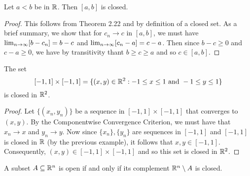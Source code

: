 \documentclass[letterpaper, twoside, 12pt]{book}
\begin{document}
\begin{example}[10.14]
  Let \(a<b\) be in \(\mathbb R\). Then \([a,b]\) is closed.
\end{example}

\begin{proof}
    This follows from Theorem 2.22 and by definition of 
    a closed set. As a brief summary, we show that for 
    \(c_n \to c \) in \([a,b]\), we must have
    \(\lim_{n \to \infty} [b - c_n] = b - c\) and \(\lim_{n \to \infty} [c_n - a] = c - a\).
    Then since \(b - c \geq 0 \) and \(c - a \geq 0\), we
    have by transitivity thant \(b \geq c \geq a \) and so
    \(c \in [a,b]\).
\end{proof}

\begin{example}[10.15]
  The set
  \[
    [-1,1]\times[-1,1]
      =
    \{(x,y)\in\mathbb R^2:-1\leq x\leq 1 \text{~and~} -1\leq y\leq 1\}
  \]
  is closed in \(\mathbb R^2\).
\end{example}

\begin{proof}
    Let \(\{(x_n, y_n)\}\) be a sequence in \([-1,1]\times[-1,1]\) that
    converges to \((x,y)\). By the Componentwise Convergence Criterion,
    we must have that \(x_n \to x\) and \(y_n \to y\). Now since 
    \(\{x_n\}, \{y_n\}\) are sequences in \([-1, 1]\) and \([-1,1]\)
    is closed in \(\mathbb R\) (by the previous example), it follows that \(x, y \in [-1,1]\).
    Consequently, \((x,y) \in [-1,1] \times [-1,1]\) and so this
    set is closed in \(\mathbb R^2\).
\end{proof}

\begin{theorem}
  A subset \(A\subseteq\mathbb R^n\) is open if and only if its complement
  \(\mathbb R^n\setminus A\) is closed.
\end{theorem}
\end{document}
